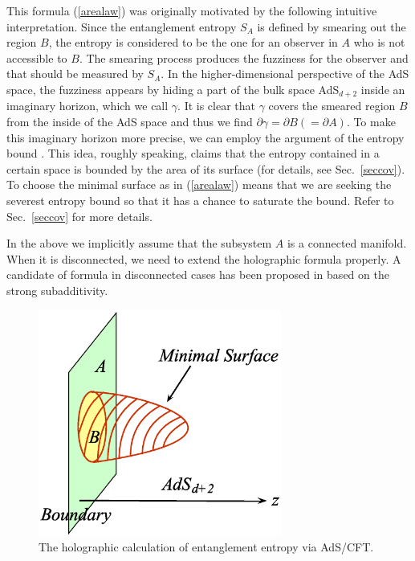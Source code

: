 \documentclass[12pt]{article}
\def\de{\partial}
\begin{document}
This formula (\ref{arealaw}) was originally motivated by the
following intuitive interpretation\cite{RuTa,RuTaL}.
Since the entanglement entropy $S_A$ is defined by smearing out the
region $B$, the entropy is considered to be the one for an observer
in $A$ who is not accessible to $B$. The smearing process produces
the fuzziness for the observer and that should be measured
 by $S_A$. In the higher-dimensional
perspective of the AdS space, the fuzziness appears by hiding a
part of the bulk space AdS$_{d+2}$ inside an imaginary horizon,
which we call $\gamma$.  It is clear that $\gamma$ covers the
smeared region $B$ from the inside of the AdS space and thus we find
$\de \gamma=\de B(=\de A)$. To make this imaginary horizon more
precise, we can employ the argument of the entropy bound \cite{Bousso}.
This idea, roughly speaking, claims that the entropy contained in a certain space
is bounded by the area of its surface (for details, see Sec.\ \ref{seccov}).
 To choose the minimal
surface as in (\ref{arealaw}) means that we are seeking the severest
entropy bound \cite{holography,BiSu,Bousso} so that it has a chance to
saturate the bound. Refer to Sec.\ \ref{seccov} for more details.

In the above we implicitly assume that the subsystem $A$ is a connected
manifold. When it is disconnected,
we need to extend the holographic formula properly.
A candidate of formula in disconnected cases has
been proposed in \cite{Hubeny:2007re} based on the strong subadditivity.

\begin{figure}
\begin{center}
\includegraphics[width=8cm,clip]{HolographicEE.eps}
\end{center}
\caption{
\label{Fig:holo}
The holographic calculation of entanglement entropy via AdS/CFT.}
\end{figure}
\end{document}
